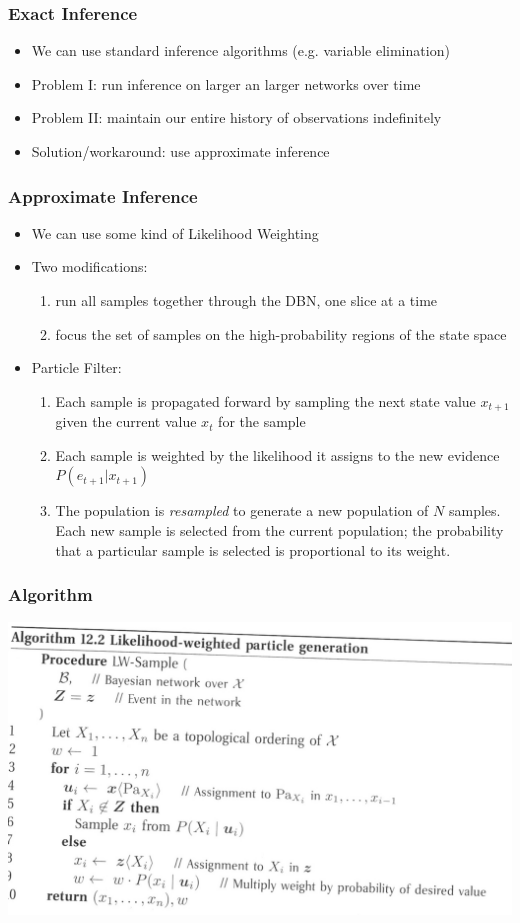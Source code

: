 \begin{frame}
\frametitle{Exact Inference}
\begin{itemize}
\item We can use standard inference algorithms (e.g. variable elimination)
\item Problem I: run inference on larger an larger networks over time
\item Problem II: maintain our entire history of observations indefinitely
\item Solution/workaround: use approximate inference
\end{itemize}
\end{frame}

\begin{frame}
\frametitle{Approximate Inference}
\begin{itemize}
\item We can use some kind of Likelihood Weighting
\item Two modifications:
\begin{enumerate}
\item run all samples together through the DBN, one slice at a time
\item focus the set of samples on the high-probability regions of the state space
\end{enumerate}
\item Particle Filter:
\begin{enumerate}
\item Each sample is propagated forward by sampling the next state value $x_{t+1}$ given the current value $x_t$ for the sample
\item Each sample is weighted by the likelihood it assigns to the new evidence $P(e_{t+1}|x_{t+1})$
\item The population is \textit{resampled} to generate a new population of $N$ samples. Each new sample is selected from the current population; the probability that a particular sample is selected is proportional to its weight.
\end{enumerate}
\end{itemize}
\end{frame}

\begin{frame}
\frametitle{Algorithm}
\includegraphics[width=1\textwidth]{figures/lwalgsimple}
\end{frame}

